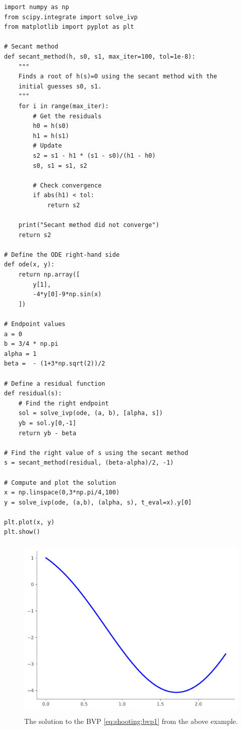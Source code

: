 \begin{lstlisting}
import numpy as np
from scipy.integrate import solve_ivp
from matplotlib import pyplot as plt

# Secant method
def secant_method(h, s0, s1, max_iter=100, tol=1e-8):
    """
    Finds a root of h(s)=0 using the secant method with the
    initial guesses s0, s1.
    """
    for i in range(max_iter):
        # Get the residuals
        h0 = h(s0)
        h1 = h(s1)
        # Update
        s2 = s1 - h1 * (s1 - s0)/(h1 - h0)
        s0, s1 = s1, s2
        
        # Check convergence
        if abs(h1) < tol:
            return s2
    
    print("Secant method did not converge")
    return s2

# Define the ODE right-hand side
def ode(x, y):
    return np.array([
        y[1], 
        -4*y[0]-9*np.sin(x)
    ])

# Endpoint values
a = 0
b = 3/4 * np.pi
alpha = 1
beta =  - (1+3*np.sqrt(2))/2

# Define a residual function
def residual(s):
    # Find the right endpoint
    sol = solve_ivp(ode, (a, b), [alpha, s])
    yb = sol.y[0,-1]
    return yb - beta

# Find the right value of s using the secant method
s = secant_method(residual, (beta-alpha)/2, -1)

# Compute and plot the solution
x = np.linspace(0,3*np.pi/4,100)
y = solve_ivp(ode, (a,b), (alpha, s), t_eval=x).y[0]

plt.plot(x, y)
plt.show()
\end{lstlisting}

\begin{figure}[H]
\includegraphics[height=3.5in]{figures/example1.pdf}
\caption{The solution to the BVP \eqref{eq:shooting:bvp1} from the above example.}
\label{fig:shooting:shooting1}
\end{figure}


